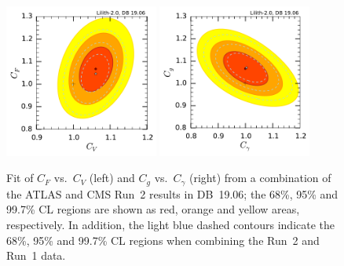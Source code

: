 \begin{figure}[h!]\centering
\includegraphics[width=0.45\textwidth]{fits/CVCF_2d_comb.pdf}%
\includegraphics[width=0.45\textwidth]{fits/CgCGa_2d_comb.pdf}%
\vspace*{-2mm}
\caption{Fit of $C_F$ vs.\ $C_V$ (left) and $C_g$ vs.\ $C_\gamma$ (right) from a combination of the ATLAS and CMS 
Run~2 results in DB~19.06; the 68\%, 95\% and 99.7\% CL regions are shown as red, orange and yellow areas, respectively. 
In addition, the light blue dashed contours indicate the 68\%, 95\% and 99.7\% CL regions when combining the Run~2 and Run~1 data.}
\label{fig:rcfit-comb}
\end{figure}
